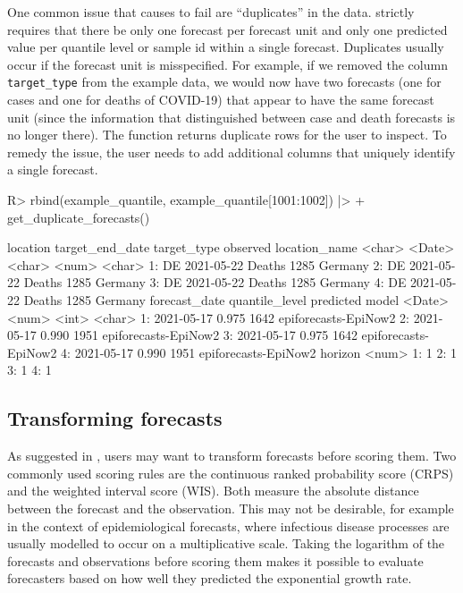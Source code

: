 \documentclass[
]{jss}
\begin{document}
One common issue that causes  to fail are
``duplicates'' in the data.  strictly requires that
there be only one forecast per forecast unit and only one predicted
value per quantile level or sample id within a single forecast.
Duplicates usually occur if the forecast unit is misspecified. For
example, if we removed the column \texttt{target\_type} from the example
data, we would now have two forecasts (one for cases and one for deaths
of COVID-19) that appear to have the same forecast unit (since the
information that distinguished between case and death forecasts is no
longer there). The function  returns
duplicate rows for the user to inspect. To remedy the issue, the user
needs to add additional columns that uniquely identify a single
forecast.

\begin{CodeChunk}
\begin{CodeInput}
R> rbind(example_quantile, example_quantile[1001:1002]) |>
+   get_duplicate_forecasts() 
\end{CodeInput}
\begin{CodeOutput}
   location target_end_date target_type observed location_name
     <char>          <Date>      <char>    <num>        <char>
1:       DE      2021-05-22      Deaths     1285       Germany
2:       DE      2021-05-22      Deaths     1285       Germany
3:       DE      2021-05-22      Deaths     1285       Germany
4:       DE      2021-05-22      Deaths     1285       Germany
   forecast_date quantile_level predicted                model
          <Date>          <num>     <int>               <char>
1:    2021-05-17          0.975      1642 epiforecasts-EpiNow2
2:    2021-05-17          0.990      1951 epiforecasts-EpiNow2
3:    2021-05-17          0.975      1642 epiforecasts-EpiNow2
4:    2021-05-17          0.990      1951 epiforecasts-EpiNow2
   horizon
     <num>
1:       1
2:       1
3:       1
4:       1
\end{CodeOutput}
\end{CodeChunk}

\subsection{Transforming forecasts}\label{transforming-forecasts}

As suggested in \cite{bosseScoringEpidemiologicalForecasts2023}, users
may want to transform forecasts before scoring them. Two commonly used
scoring rules are the continuous ranked probability score (CRPS) and the
weighted interval score (WIS). Both measure the absolute distance
between the forecast and the observation. This may not be desirable, for
example in the context of epidemiological forecasts, where infectious
disease processes are usually modelled to occur on a multiplicative
scale. Taking the logarithm of the forecasts and observations before
scoring them makes it possible to evaluate forecasters based on how well
they predicted the exponential growth rate.
\end{document}
